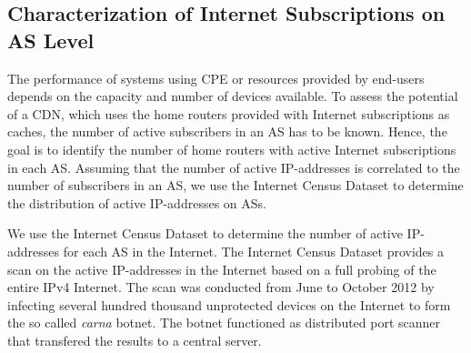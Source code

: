%

\subsection{Characterization of Internet Subscriptions on AS Level}\label{sec:aslevel:census}

The performance of systems using CPE or resources provided by end-users depends on the capacity and number of devices available.
To assess the potential of a CDN, which uses the home routers provided with Internet subscriptions as caches, the number of active subscribers in an AS has to be known.
Hence, the goal is to identify the number of home routers with active Internet subscriptions in each AS.
Assuming that the number of active IP-addresses is correlated to the number of subscribers in an AS, we use the Internet Census Dataset to determine the distribution of active IP-addresses on ASs.

We use the Internet Census Dataset \cite{carna2013} to determine the number of active IP-addresses for each AS in the Internet.
The Internet Census Dataset provides a scan on the active IP-addresses in the Internet based on a full probing of the entire IPv4 Internet.
The scan was conducted from June to October 2012 by infecting several hundred thousand unprotected devices on the Internet to form the so called \emph{carna} botnet.
The botnet functioned as distributed port scanner that transfered the results to a central server.

